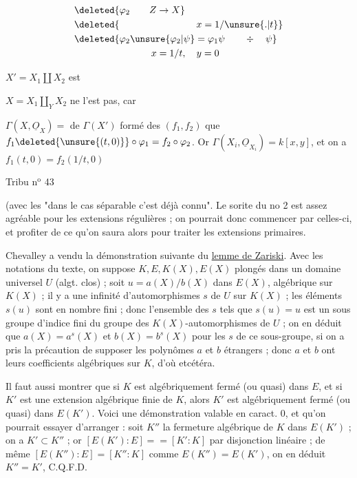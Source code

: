 \[
\begin{aligned}
&\deleted{\varphi_2\qquad Z\to X}\\
&\deleted{\hspace{8em}x=1/\unsure{.|t}}\\
&\deleted{\varphi_2\unsure{\varphi_2|\psi}=\varphi_1\psi\qquad\div\quad\psi}\\
&\hspace{8em}x=1/t,\quad y=0
\end{aligned}
\]

$X'=X_1\amalg X_2$ est 

$X=X_1\amalg_Y X_2$ ne l'est pas, car

$\Gamma(X,\underline O_X)={}$   de $\Gamma(X')$ formé des $(f_1,f_2)$  que $f_1\deleted{\unsure{(t,0)}}\circ\varphi_1=f_2\circ\varphi_2$. Or $\Gamma(X_i,\underline O_{X_i})=k[x,y]$, et on a $f_1(t,0)=f_2(1/t,0)$



Tribu \quad n$^{\mathrm{o}}$ 43

(avec les "dans le cas séparable c'est déjà connu". Le sorite du no 2 est assez agréable pour les extensions régulières ; on pourrait donc commencer par celles-ci, et profiter de ce qu'on saura alors pour traiter les extensions primaires.

Chevalley a vendu la démonstration suivante du \uline{lemme de Zariski}. Avec les notations du texte, on suppose $K,E,K(X),E(X)$ plongés dans un domaine universel $U$ (algt. clos) ; soit $u=a(X)/b(X)$ dans $E(X)$, algébrique sur $K(X)$ ; il y a une infinité d'automorphismes $s$ de $U$ sur $K(X)$ ; les éléments $s(u)$ sont en nombre fini ; donc l'ensemble des $s$ tels que $s(u)=u$ est un sous groupe d'indice fini du groupe des $K(X)$-automorphismes de $U$ ; on en déduit que $a(X)=a^s(X)$ et $b(X)=b^s(X)$ pour les $s$ de ce sous-groupe, si on a pris la précaution de supposer les polynômes $a$ et $b$ étrangers ; donc $a$ et $b$ ont leurs coefficients algébriques sur $K$, d'où etcétéra.

Il faut aussi montrer que si $K$ est algébriquement fermé (ou quasi) dans $E$, et si $K'$ est une extension algébrique finie de $K$, alors $K'$ est algébriquement fermé (ou quasi) dans $E(K')$. Voici une démonstration valable en caract. $0$, et qu'on pourrait essayer d'arranger : soit $K''$ la fermeture algébrique de $K$ dans $E(K')$ ; on a $K'\subset K''$ ; or $[E(K'):E]==[K':K]$ par disjonction linéaire ; de même $[E(K''):E]=[K'':K]$ comme $E(K'')=E(K')$, on en déduit $K''=K'$, C.Q.F.D.

